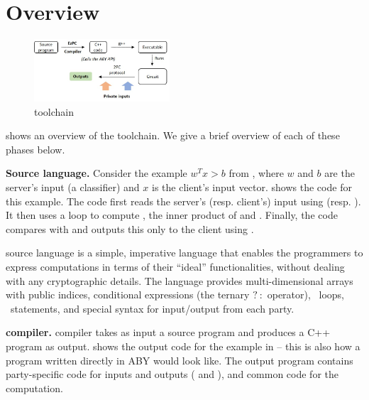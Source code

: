 
\section{\tool Overview}
\label{sec:ex}

\begin{figure}
  \includegraphics[width=0.45\textwidth]{toolchain}
\caption{\tool toolchain}
\label{fig:toolchain}
\end{figure}

 shows an overview of the \tool
toolchain. We give a brief overview of each of these phases below.

\noindent\textbf{Source language.}
Consider the example $w^Tx >b$ from , where
$w$ and $b$ are the server's input (a classifier) and $x$ is
the client's input vector.  shows the \tool code
for this example. The code first reads the server's (resp. client's) input using
  (resp. ). It then uses a
 loop to compute , the inner product of  and
. Finally, the code compares 
with  and outputs this only to the client using .

\tool source language is a simple, imperative language that enables
the programmers to express \mpc computations in terms of their
``ideal'' functionalities, without dealing with any cryptographic
details. The language provides multi-dimensional arrays with public indices, conditional
expressions (the ternary $?\::$ operator), ~loops,
~statements, and special syntax for input/output from each party.

\noindent\textbf{\tool compiler.}
\tool compiler takes as input a source program and produces a C++
program as output.  shows the output code for
the example in  -- this is also how a program written directly in
  ABY would look like. The output program
contains party-specific code for inputs and outputs
( and ), and common code for the
computation.

